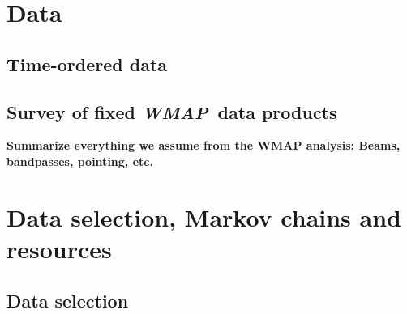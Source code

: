 \documentclass[twocolumn]{../../common/aa}
\def\WMAP{\emph{WMAP}}
\newcommand{\BP}{\textsc{BeyondPlanck}}
\begin{document}



\section{Data}
\label{sec:data}


\subsection{Time-ordered data}
\label{sec:tod}

\subsection{Survey of fixed \WMAP\ data products}
\label{sec:fixedproducts}

\textbf{Summarize everything we assume from the WMAP analysis: Beams, bandpasses, pointing, etc.}



\section{Data selection, Markov chains and resources}
\label{sec:markov_chains}

\subsection{Data selection}
\end{document}
